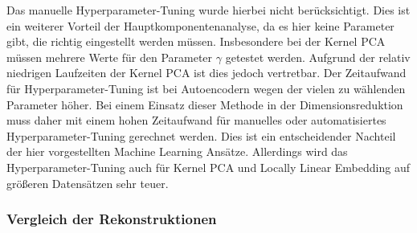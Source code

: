 Das manuelle Hyperparameter-Tuning wurde hierbei nicht berücksichtigt. Dies ist ein weiterer
Vorteil der Hauptkomponentenanalyse, da es hier keine Parameter gibt, die richtig eingestellt
werden müssen. Insbesondere bei der Kernel PCA müssen mehrere Werte für den Parameter $\gamma$
getestet werden. Aufgrund der relativ niedrigen Laufzeiten der Kernel PCA ist dies jedoch
vertretbar. Der Zeitaufwand für Hyperparameter-Tuning ist bei Autoencodern wegen der vielen zu
wählenden Parameter höher. Bei einem Einsatz dieser Methode in der Dimensionsreduktion muss daher
mit einem hohen Zeitaufwand für manuelles oder automatisiertes Hyperparameter-Tuning gerechnet
werden. Dies ist ein entscheidender Nachteil der hier vorgestellten Machine Learning Ansätze.
Allerdings wird das Hyperparameter-Tuning auch für Kernel PCA und Locally Linear Embedding auf
größeren Datensätzen sehr teuer.

\subsubsection{Vergleich der Rekonstruktionen}


